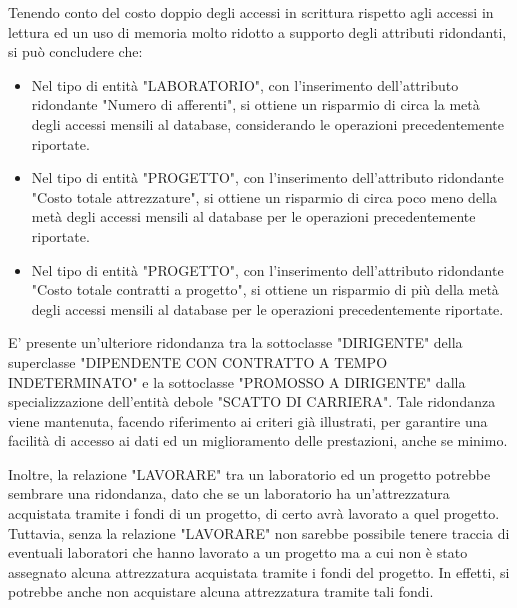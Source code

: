             Tenendo conto del costo doppio degli accessi in scrittura rispetto agli accessi in lettura ed un uso di memoria molto ridotto a supporto degli attributi ridondanti, si può concludere che:
            \begin{itemize}
                \item Nel tipo di entità "LABORATORIO", con l'inserimento dell'attributo ridondante "Numero di afferenti", si ottiene un risparmio di circa la metà degli accessi mensili al database, considerando le operazioni precedentemente riportate.
                \item Nel tipo di entità "PROGETTO", con l'inserimento dell'attributo ridondante "Costo totale attrezzature", si ottiene un risparmio di circa poco meno della metà degli accessi mensili al database per le operazioni precedentemente riportate.
                \item Nel tipo di entità "PROGETTO", con l'inserimento dell'attributo ridondante "Costo totale contratti a progetto", si ottiene un risparmio di più della metà degli accessi mensili al database per le operazioni precedentemente riportate.
            \end{itemize}
            E' presente un'ulteriore ridondanza tra la sottoclasse "DIRIGENTE" della superclasse "DIPENDENTE CON CONTRATTO A TEMPO INDETERMINATO" e la sottoclasse "PROMOSSO A DIRIGENTE" dalla specializzazione dell'entità debole "SCATTO DI CARRIERA". Tale ridondanza viene mantenuta, facendo riferimento ai criteri già illustrati, per garantire una facilità di accesso ai dati ed un miglioramento delle prestazioni, anche se minimo.
            
            Inoltre, la relazione "LAVORARE" tra un laboratorio ed un progetto potrebbe sembrare una ridondanza, dato che se un laboratorio ha un'attrezzatura acquistata tramite i fondi di un progetto, di certo avrà lavorato a quel progetto. Tuttavia, senza la relazione "LAVORARE" non sarebbe possibile tenere traccia di eventuali laboratori che hanno lavorato a un progetto ma a cui non è stato assegnato alcuna attrezzatura acquistata tramite i fondi del progetto. In effetti, si potrebbe anche non acquistare alcuna attrezzatura tramite tali fondi.\\

